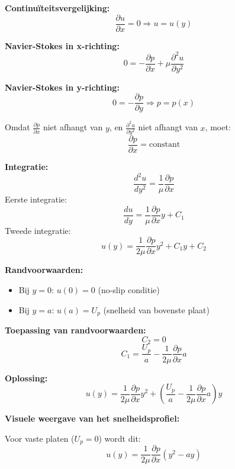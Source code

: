 \documentclass[a4paper,11pt,twoside]{report}
\begin{document}
\textbf{Continuïteitsvergelijking:}
\[
\frac{\partial u}{\partial x} = 0 \Rightarrow u = u(y)
\]

\textbf{Navier-Stokes in x-richting:}
\[
0 = -\frac{\partial p}{\partial x} + \mu \frac{\partial^2 u}{\partial y^2}
\]

\textbf{Navier-Stokes in y-richting:}
\[
0 = -\frac{\partial p}{\partial y} \Rightarrow p = p(x)
\]

Omdat $\frac{\partial p}{\partial x}$ niet afhangt van $y$, en $\frac{\partial^2 u}{\partial y^2}$ niet afhangt van $x$, moet:
\[
\frac{\partial p}{\partial x} = \text{constant}
\]

\textbf{Integratie:}
\[
\frac{d^2 u}{dy^2} = \frac{1}{\mu} \frac{\partial p}{\partial x}
\]
Eerste integratie:
\[
\frac{du}{dy} = \frac{1}{\mu} \frac{\partial p}{\partial x} y + C_1
\]
Tweede integratie:
\[
u(y) = \frac{1}{2\mu} \frac{\partial p}{\partial x} y^2 + C_1 y + C_2
\]

\textbf{Randvoorwaarden:}
\begin{itemize}
    \item Bij $y=0$: $u(0) = 0$ (no-slip conditie)
    \item Bij $y=a$: $u(a) = U_p$ (snelheid van bovenste plaat)
\end{itemize}

\textbf{Toepassing van randvoorwaarden:}
\[
C_2 = 0
\]
\[
C_1 = \frac{U_p}{a} - \frac{1}{2\mu} \frac{\partial p}{\partial x} a
\]

\textbf{Oplossing:}
\[
u(y) = \frac{1}{2\mu} \frac{\partial p}{\partial x} y^2 + \left( \frac{U_p}{a} - \frac{1}{2\mu} \frac{\partial p}{\partial x} a \right) y
\]

\textbf{Visuele weergave van het snelheidsprofiel:}

Voor vaste platen ($U_p = 0$) wordt dit:
\[
u(y) = \frac{1}{2\mu} \frac{\partial p}{\partial x} (y^2 - ay)
\]
\end{document}

